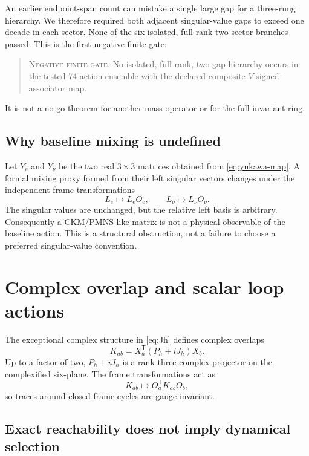 \documentclass[11pt]{article}
\newcommand{\status}[1]{\textsc{#1}}
\begin{document}
An earlier endpoint-span count can mistake a single large gap for a three-rung hierarchy.  We therefore required both adjacent singular-value gaps to exceed one decade in each sector.  None of the six isolated, full-rank two-sector branches passed.  This is the first negative finite gate:
\begin{quote}
\status{Negative finite gate.} No isolated, full-rank, two-gap hierarchy occurs in the tested 74-action ensemble with the declared composite-$V$ signed-associator map.
\end{quote}
It is not a no-go theorem for another mass operator or for the full invariant ring.

\subsection{Why baseline mixing is undefined}

Let $Y_e$ and $Y_\nu$ be the two real $3\times3$ matrices obtained from \cref{eq:yukawa-map}.  A formal mixing proxy formed from their left singular vectors changes under the independent frame transformations
\begin{equation}
  L_e\mapsto L_e O_e,\qquad L_\nu\mapsto L_\nu O_\nu.
\end{equation}
The singular values are unchanged, but the relative left basis is arbitrary.  Consequently a CKM/PMNS-like matrix is not a physical observable of the baseline action.  This is a structural obstruction, not a failure to choose a preferred singular-value convention.

\section{Complex overlap and scalar loop actions}
\label{sec:loops}

The exceptional complex structure in \cref{eq:Jh} defines complex overlaps
\begin{equation}
  K_{ab}=X_a^{\mathsf T}(P_h+iJ_h)X_b.
  \label{eq:Kab}
\end{equation}
Up to a factor of two, $P_h+iJ_h$ is a rank-three complex projector on the complexified six-plane.  The frame transformations act as
\begin{equation}
  K_{ab}\mapsto O_a^{\mathsf T}K_{ab}O_b,
\end{equation}
so traces around closed frame cycles are gauge invariant.

\subsection{Exact reachability does not imply dynamical selection}
\end{document}
